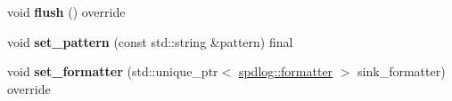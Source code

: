 \begin{DoxyCompactItemize}
\mbox{\label{classspdlog_1_1sinks_1_1ansicolor__sink_abaf2aa96804780a5cdfe3dabebe75b06}} 
void {\bfseries flush} () override
\item 
\mbox{\label{classspdlog_1_1sinks_1_1ansicolor__sink_a0add9462c57ab6959de73a93212eb736}} 
void {\bfseries set\+\_\+pattern} (const std\+::string \&pattern) final
\item 
\mbox{\label{classspdlog_1_1sinks_1_1ansicolor__sink_a455e5ecf787682d3bc03f15bcdd58234}} 
void {\bfseries set\+\_\+formatter} (std\+::unique\+\_\+ptr$<$ \hyperlink{classspdlog_1_1formatter}{spdlog\+::formatter} $>$ sink\+\_\+formatter) override
\end{DoxyCompactItemize}
